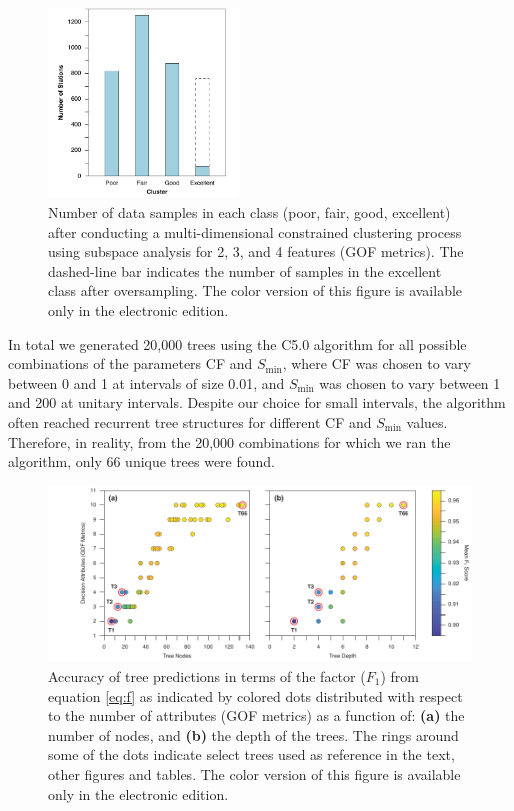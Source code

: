 \begin{figure}[t]
	\centering
	\includegraphics[width=0.45\textwidth]{figures/pdf/figure-07}
	\caption{Number of data samples in each class (poor, fair, good, excellent) after conducting a multi-dimensional constrained \kmeans{} clustering process using subspace analysis for 2, 3, and 4 features (GOF metrics). The dashed-line bar indicates the number of samples in the excellent class after oversampling. The color version of this figure is available only in the electronic edition.}
	\label{fig:count-classes}
\end{figure}

In total we generated 20,000 trees using the C5.0 algorithm for all possible combinations of the parameters CF and $S_{\min}$, where CF was chosen to vary between 0 and 1 at intervals of size 0.01, and $S_{\min}$ was chosen to vary between 1 and 200 at unitary intervals. Despite our choice for small intervals, the algorithm often reached recurrent tree structures for different CF and $S_{\min}$ values. Therefore, in reality, from the 20,000 combinations for which we ran the algorithm, only 66 unique trees were found. 

\begin{figure}[t]
	\centering
	\includegraphics[width=\textwidth]{figures/pdf/figure-08}
	\caption{Accuracy of tree predictions in terms of the factor ($F_1$) from equation \ref{eq:f} as indicated by colored dots distributed with respect to the number of attributes (GOF metrics) as a function of: \textbf{(a)} the number of nodes, and \textbf{(b)} the depth of the trees. The rings around some of the dots indicate select trees used as reference in the text, other figures and tables. The color version of this figure is available only in the electronic edition.}
	\label{fig:nodes-depth}
\end{figure}

